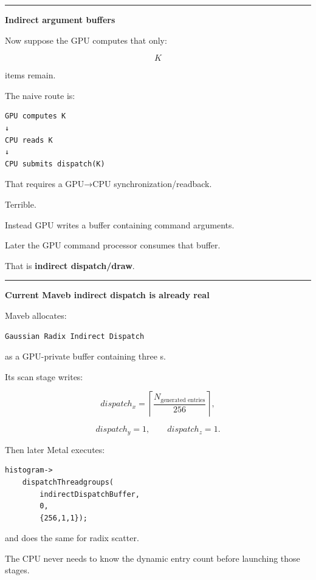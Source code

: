 \begin{center}\rule{0.5\linewidth}{0.5pt}\end{center}

\textbf{Indirect argument buffers}

Now suppose the GPU computes that only:

\[
K
\]

items remain.

The naive route is:

\protect{}\label{p10-bad-readback}%
\begin{verbatim}
GPU computes K
↓
CPU reads K
↓
CPU submits dispatch(K)
\end{verbatim}

That requires a GPU→CPU synchronization/readback.

Terrible.

Instead GPU writes a buffer containing command arguments.

Later the GPU command processor consumes that buffer.

That is \textbf{indirect dispatch/draw}.

\begin{center}\rule{0.5\linewidth}{0.5pt}\end{center}

\textbf{Current Maveb indirect dispatch is already real}

Maveb allocates:

\protect{}\label{p10-indirect-buffer}%
\begin{verbatim}
Gaussian Radix Indirect Dispatch
\end{verbatim}

as a GPU-private buffer containing three s.

Its scan stage writes:

\[
dispatch_x
=
\left\lceil
\frac{
N_{\text{generated entries}}
}{
256
}
\right\rceil,
\]

\[
dispatch_y=1,
\qquad
dispatch_z=1.
\]

Then later Metal executes:

\protect{}\label{p10-indirect-dispatch}%
\begin{verbatim}
histogram->
    dispatchThreadgroups(
        indirectDispatchBuffer,
        0,
        {256,1,1});
\end{verbatim}

and does the same for radix scatter.

The CPU never needs to know the dynamic entry count before launching those stages.

